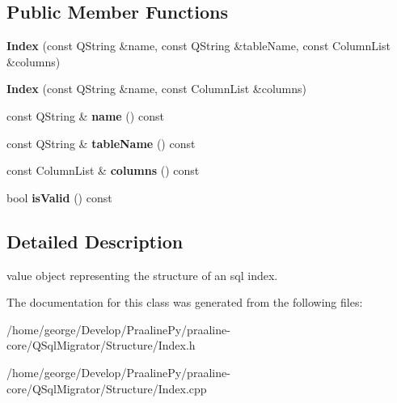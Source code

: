 \subsection*{Public Member Functions}
\begin{DoxyCompactItemize}
\item 
\mbox{\label{class_q_sql_migrator_1_1_structure_1_1_index_a2d1e61abc66626d3a400a927b1cfa8c8}} 
{\bfseries Index} (const Q\+String \&name, const Q\+String \&table\+Name, const Column\+List \&columns)
\item 
\mbox{\label{class_q_sql_migrator_1_1_structure_1_1_index_a5af05609bc675d9a505605b4f087d59b}} 
{\bfseries Index} (const Q\+String \&name, const Column\+List \&columns)
\item 
\mbox{\label{class_q_sql_migrator_1_1_structure_1_1_index_a8ca6ee617199a08408036a146231e01b}} 
const Q\+String \& {\bfseries name} () const
\item 
\mbox{\label{class_q_sql_migrator_1_1_structure_1_1_index_a6bb6792e5cdb715f2dfd5280868d8544}} 
const Q\+String \& {\bfseries table\+Name} () const
\item 
\mbox{\label{class_q_sql_migrator_1_1_structure_1_1_index_aaf0d3dd89cfd92d87970b80611c16797}} 
const Column\+List \& {\bfseries columns} () const
\item 
\mbox{\label{class_q_sql_migrator_1_1_structure_1_1_index_af8faac85c9b7b1838da51c2585726ff2}} 
bool {\bfseries is\+Valid} () const
\end{DoxyCompactItemize}


\subsection{Detailed Description}
value object representing the structure of an sql index. 

The documentation for this class was generated from the following files\+:\begin{DoxyCompactItemize}
\item 
/home/george/\+Develop/\+Praaline\+Py/praaline-\/core/\+Q\+Sql\+Migrator/\+Structure/Index.\+h\item 
/home/george/\+Develop/\+Praaline\+Py/praaline-\/core/\+Q\+Sql\+Migrator/\+Structure/Index.\+cpp\end{DoxyCompactItemize}
